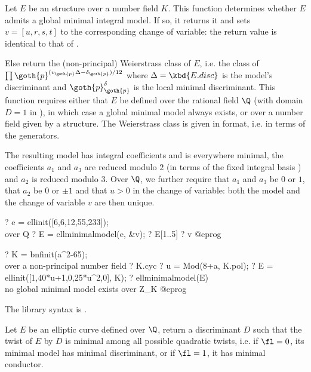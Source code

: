 \label{se:ellminimalmodel}
Let $E$ be an  structure over a number field $K$. This function
determines whether $E$ admits a global minimal integral model. If so, it
returns it and sets $v = [u,r,s,t]$ to the corresponding change of variable:
the return value is identical to that of .

Else return the (non-principal) Weierstrass class of $E$, i.e. the class of
$\prod \goth{p}^{(v_{\goth{p}}{\Delta} - \delta_{\goth{p}}) / 12}$ where
$\Delta = \kbd{E.disc}$ is the model's discriminant and
$\goth{p} ^ \delta_{\goth{p}}$ is the local minimal discriminant.
This function requires either that $E$ be defined
over the rational field $\Q$ (with domain $D = 1$ in ),
in which case a global minimal model always exists, or over a number
field given by a  structure. The Weierstrass class is given in
 format, i.e. in terms of the  generators.

The resulting model has integral coefficients and is everywhere minimal, the
coefficients $a_1$ and $a_3$ are reduced modulo $2$ (in terms of the fixed
integral basis ) and $a_2$ is reduced modulo $3$. Over $\Q$, we
further require that $a_1$ and $a_3$ be $0$ or $1$, that $a_2$ be $0$ or $\pm
1$ and that $u > 0$ in the change of variable: both the model and the change
of variable $v$ are then unique.

\bprog
? e = ellinit([6,6,12,55,233]);  \\ over Q
? E = ellminimalmodel(e, &v);
? E[1..5]
? v
@eprog

\bprog
? K = bnfinit(a^2-65);  \\ over a non-principal number field
? K.cyc
? u = Mod(8+a, K.pol);
? E = ellinit([1,40*u+1,0,25*u^2,0], K);
? ellminimalmodel(E) \\ no global minimal model exists over Z_K
@eprog

The library syntax is .

\label{se:ellminimaltwist}
Let $E$ be an elliptic curve defined over $\Q$, return
a discriminant $D$ such that the twist of $E$ by $D$ is minimal among all
possible quadratic twists, i.e. if $\fl=0$, its minimal model has minimal
discriminant, or if $\fl=1$, it has minimal conductor.

